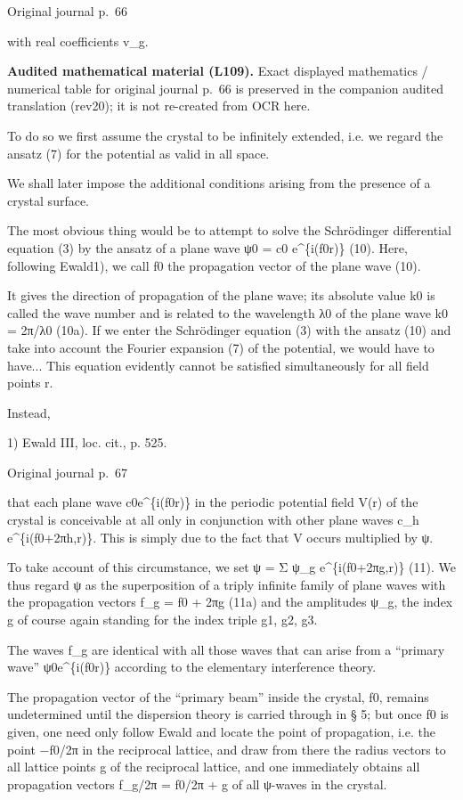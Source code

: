 \documentclass[10pt]{article}
\newcommand{\origpage}[1]{\par\medskip\noindent\hfill{\small\color{notegray}Original journal p.~#1}\hfill\mbox{}\par\smallskip}
\newcommand{\mathref}[2]{\par\smallskip\noindent\colorbox{gray!8}{\parbox{0.95\linewidth}{\small\color{notegray}\textbf{Audited mathematical material (L#1).} Exact displayed mathematics / numerical table for original journal p.~#2 is preserved in the companion audited translation (rev20); it is not re-created from OCR here.}}\par\smallskip}
\begin{document}
\origpage{66}
with real coefficients v\_g.\par
\mathref{109}{66}
To do so we first assume the crystal to be infinitely extended, i.e. we regard the ansatz (7) for the potential as valid in all space.\par
We shall later impose the additional conditions arising from the presence of a crystal surface.\par
The most obvious thing would be to attempt to solve the Schrödinger differential equation (3) by the ansatz of a plane wave ψ0 = c0 e\textasciicircum{}\{i(f0r)\} (10). Here, following Ewald1), we call f0 the propagation vector of the plane wave (10).\par
It gives the direction of propagation of the plane wave; its absolute value k0 is called the wave number and is related to the wavelength λ0 of the plane wave k0 = 2π/λ0 (10a). If we enter the Schrödinger equation (3) with the ansatz (10) and take into account the Fourier expansion (7) of the potential, we would have to have... This equation evidently cannot be satisfied simultaneously for all field points r.\par
Instead,\par
\noindent\footnotesize 1) Ewald III, loc. cit., p. 525.\par\normalsize
\origpage{67}
that each plane wave c0e\textasciicircum{}\{i(f0r)\} in the periodic potential field V(r) of the crystal is conceivable at all only in conjunction with other plane waves c\_h e\textasciicircum{}\{i(f0+2πh,r)\}. This is simply due to the fact that V occurs multiplied by ψ.\par
To take account of this circumstance, we set ψ = Σ ψ\_g e\textasciicircum{}\{i(f0+2πg,r)\} (11). We thus regard ψ as the superposition of a triply infinite family of plane waves with the propagation vectors f\_g = f0 + 2πg (11a) and the amplitudes ψ\_g, the index g of course again standing for the index triple g1, g2, g3.\par
The waves f\_g are identical with all those waves that can arise from a “primary wave” ψ0e\textasciicircum{}\{i(f0r)\} according to the elementary interference theory.\par
The propagation vector of the “primary beam” inside the crystal, f0, remains undetermined until the dispersion theory is carried through in § 5; but once f0 is given, one need only follow Ewald and locate the point of propagation, i.e. the point −f0/2π in the reciprocal lattice, and draw from there the radius vectors to all lattice points g of the reciprocal lattice, and one immediately obtains all propagation vectors f\_g/2π = f0/2π + g of all ψ-waves in the crystal.\par
\end{document}
